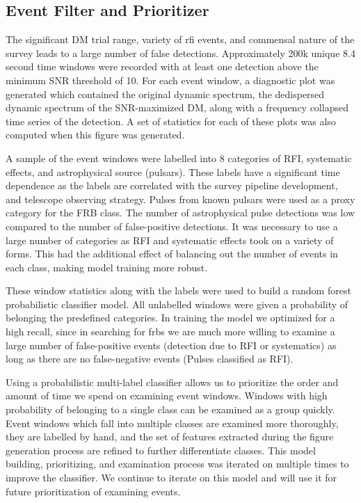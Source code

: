 \documentclass[a4paper,fleqn,usenatbib]{mnras}
\begin{document}


\subsection{Event Filter and Prioritizer}
\label{sec:event_classify}

The significant DM trial range, variety of \gls{rfi} events, and commensal nature
of the survey leads to a large number of false detections. Approximately 200k
unique 8.4 second time windows were recorded with at least one detection above
the minimum SNR threshold of 10. For each event window, a diagnostic plot was
generated which contained the original dynamic spectrum, the dedispersed dynamic
spectrum of the SNR-maximized DM, along with a frequency collapsed time series
of the detection. A set of statistics for each of these plots was also computed
when this figure was generated.

A sample of the event windows were labelled into 8 categories of RFI, systematic
effects, and astrophysical source (pulsars). These labels have a significant
time dependence as the labels are correlated with the survey pipeline
development, and telescope observing strategy.  Pulses from known pulsars were
used as a proxy category for the FRB class. The number of astrophysical pulse
detections was low compared to the number of false-positive detections. It was
necessary to use a large number of categories as RFI and systematic effects took
on a variety of forms.  This had the additional effect of balancing out the
number of events in each class, making model training more robust.

These window statistics along with the labels were used to build a random forest
probabilistic classifier model. All unlabelled windows were given a probability of
belonging the predefined categories. In training the model we optimized for a
high recall, since in searching for \glspl{frb} we are much more willing to
examine a large number of false-positive events (detection due to RFI or
systematics) as long as there are no false-negative events (Pulses classified as
RFI). 

Using a probabilistic multi-label classifier allows us to prioritize the order and
amount of time we spend on examining event windows. Windows with high
probability of belonging to a single class can be examined as a group quickly.
Event windows which fall into multiple classes are examined more thoroughly,
they are labelled by hand, and the set of features extracted during the figure
generation process are refined to further differentiate classes. This
model building, prioritizing, and examination process was iterated on multiple
times to improve the classifier. We continue to iterate on this model and will
use it for future prioritization of examining events.
\end{document}

